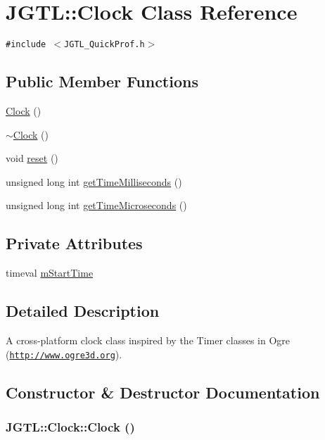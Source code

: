 \hypertarget{class_j_g_t_l_1_1_clock}{
\section{JGTL::Clock Class Reference}
\label{class_j_g_t_l_1_1_clock}
}
{\tt \#include $<$JGTL\_\-Quick\-Prof.h$>$}

\subsection*{Public Member Functions}
\begin{CompactItemize}
\item 
\hyperlink{class_j_g_t_l_1_1_clock_385fd701e33bd79081cbf24e4711ab1f}{Clock} ()
\item 
\hyperlink{class_j_g_t_l_1_1_clock_acafb81561e1443d61ca479a68958ba6}{$\sim$Clock} ()
\item 
void \hyperlink{class_j_g_t_l_1_1_clock_3a08f80094f489adc52bf1f2ca92ded6}{reset} ()
\item 
unsigned long int \hyperlink{class_j_g_t_l_1_1_clock_a0719596dc560b7a09304f939bcb1577}{get\-Time\-Milliseconds} ()
\item 
unsigned long int \hyperlink{class_j_g_t_l_1_1_clock_d7b56e96fa0b80d1fa8bc98de34e5c4a}{get\-Time\-Microseconds} ()
\end{CompactItemize}
\subsection*{Private Attributes}
\begin{CompactItemize}
\item 
timeval \hyperlink{class_j_g_t_l_1_1_clock_b966f80f2c6e5201f2791b1872b2db7d}{m\-Start\-Time}
\end{CompactItemize}


\subsection{Detailed Description}
A cross-platform clock class inspired by the Timer classes in Ogre (\href{http://www.ogre3d.org}{\tt http://www.ogre3d.org}). 



\subsection{Constructor \& Destructor Documentation}
\hypertarget{class_j_g_t_l_1_1_clock_385fd701e33bd79081cbf24e4711ab1f}{
\subsubsection[Clock]{\setlength{\rightskip}{0pt plus 5cm}JGTL::Clock::Clock ()}}
\label{class_j_g_t_l_1_1_clock_385fd701e33bd79081cbf24e4711ab1f}



